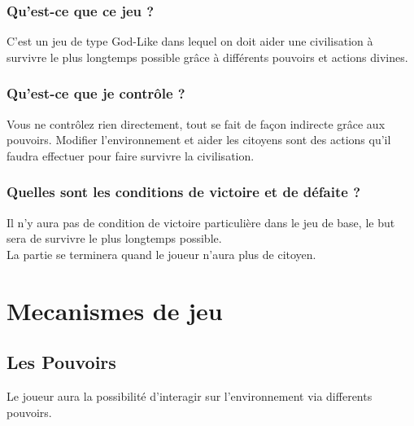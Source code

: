\documentclass[a4paper]{memoir}
\begin{document}
				\subsubsection{Qu'est-ce que ce jeu ?}
					C'est un jeu de type God-Like dans lequel on doit aider une civilisation à survivre le plus longtemps possible grâce à différents pouvoirs et actions divines.
			
				\subsubsection{Qu'est-ce que je contrôle ?}
					Vous ne contrôlez rien directement, tout se fait de façon indirecte grâce aux pouvoirs. Modifier l'environnement et aider les citoyens sont des actions qu'il faudra effectuer pour faire survivre la civilisation.
		
				\subsubsection{Quelles sont les conditions de victoire et de défaite ?}
					Il n'y aura pas de condition de victoire particulière dans le jeu de base, le but sera de survivre le plus longtemps possible.\\
					La partie se terminera quand le joueur n'aura plus de citoyen.
			
		\section{Mecanismes de jeu}
		
			\subsection{Les Pouvoirs}
				\label{Pouvoirs}
				Le joueur aura la possibilité d'interagir sur l'environnement via differents pouvoirs.
				
\end{document}
